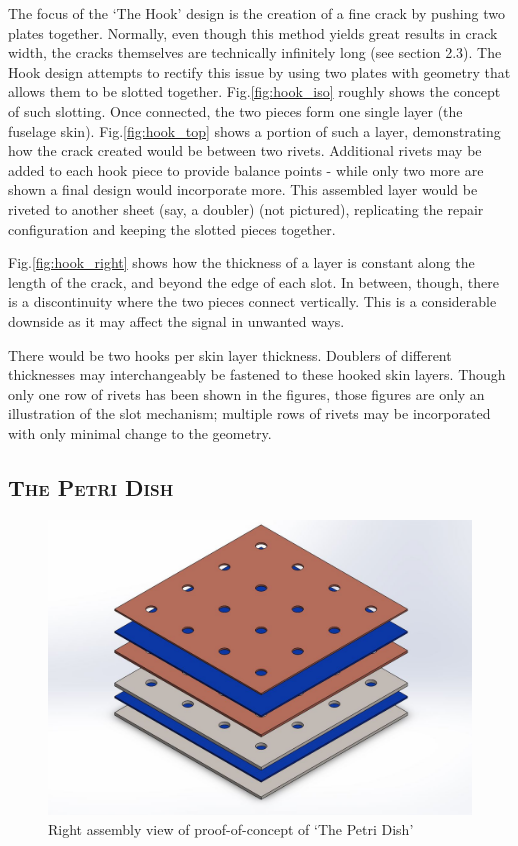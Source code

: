 \documentclass[12pt]{article}
\begin{document}
The focus of the `The Hook' design is the creation of a fine crack by pushing two plates together. Normally, even though this method yields great results in crack width, the cracks themselves are technically infinitely long (see section 2.3). The Hook design attempts to rectify this issue by using two plates with geometry that allows them to be slotted together. Fig.\ref{fig:hook_iso} roughly shows the concept of such slotting. Once connected, the two pieces form one single layer (the fuselage skin). Fig.\ref{fig:hook_top} shows a portion of such a layer, demonstrating how the crack created would be between two rivets. Additional rivets may be added to each hook piece to provide balance points - while only two more are shown a final design would incorporate more. This assembled layer would be riveted to another sheet (say, a doubler) (not pictured), replicating the repair configuration and keeping the slotted pieces together.

Fig.\ref{fig:hook_right} shows how the thickness of a layer is constant along the length of the crack, and beyond the edge of each slot. In between, though, there is a discontinuity where the two pieces connect vertically. This is a considerable downside as it may affect the signal in unwanted ways.

There would be two hooks per skin layer thickness. Doublers of different thicknesses may interchangeably be fastened to these hooked skin layers. Though only one row of rivets has been shown in the figures, those figures are only an illustration of the slot mechanism; multiple rows of rivets may be incorporated with only minimal change to the geometry.

\clearpage
\subsection{\textsc{The Petri Dish} }

\begin{figure}[h!]
  \centering
  	\includegraphics[width=\textwidth]{Petri_iso}
  \caption{Right assembly view of proof-of-concept of `The Petri Dish'}
  \label{fig:petri_iso}
\end{figure}
\end{document}
